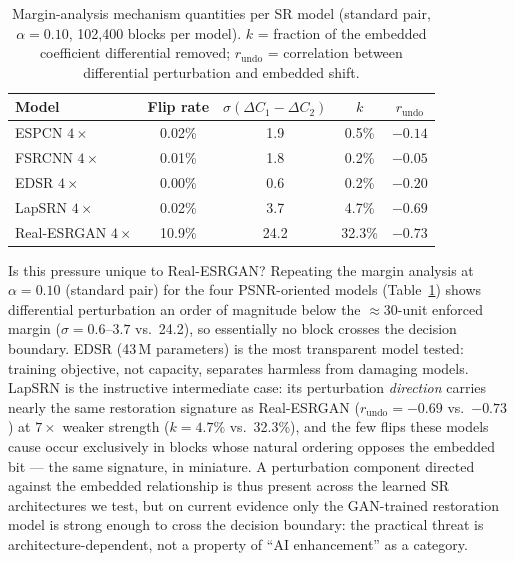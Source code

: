 \documentclass[conference]{IEEEtran}
\begin{document}
\begin{table}[t]
\caption{Margin-analysis mechanism quantities per SR model (standard
pair, $\alpha=0.10$, 102,400 blocks per model). $k$ = fraction of the
embedded coefficient differential removed; $r_{\mathrm{undo}}$ =
correlation between differential perturbation and embedded shift.}
\label{tab:mechanism}
\centering
\begin{tabular}{lcccc}
\toprule
Model & Flip rate & $\sigma(\Delta C_1{-}\Delta C_2)$ & $k$ & $r_{\mathrm{undo}}$ \\
\midrule
ESPCN $4\times$       & 0.02\% & 1.9  & 0.5\%  & $-0.14$ \\
FSRCNN $4\times$      & 0.01\% & 1.8  & 0.2\%  & $-0.05$ \\
EDSR $4\times$        & 0.00\% & 0.6  & 0.2\%  & $-0.20$ \\
LapSRN $4\times$      & 0.02\% & 3.7  & 4.7\%  & $-0.69$ \\
Real-ESRGAN $4\times$ & 10.9\% & 24.2 & 32.3\% & $-0.73$ \\
\bottomrule
\end{tabular}
\end{table}

Is this pressure unique to Real-ESRGAN? Repeating the margin analysis
at $\alpha = 0.10$ (standard pair) for the four PSNR-oriented models
(Table~\ref{tab:mechanism}) shows differential perturbation an order of
magnitude below the $\approx$30-unit enforced margin ($\sigma =
0.6$--$3.7$ vs.\ 24.2), so essentially no block crosses the decision
boundary. EDSR (43\,M parameters) is the most transparent model tested:
training objective, not capacity, separates harmless from damaging
models. LapSRN is the instructive intermediate case: its perturbation
\emph{direction} carries nearly the same restoration signature as
Real-ESRGAN ($r_{\mathrm{undo}} = -0.69$ vs.\ $-0.73$) at $7\times$
weaker strength ($k = 4.7\%$ vs.\ 32.3\%), and the few flips these
models cause occur exclusively in blocks whose natural ordering opposes
the embedded bit --- the same signature, in miniature. A perturbation
component directed against the embedded relationship is thus present
across the learned SR architectures we test, but on current evidence
only the GAN-trained restoration model is strong enough to cross the
decision boundary: the practical threat is architecture-dependent, not
a property of ``AI enhancement'' as a category.
\end{document}
